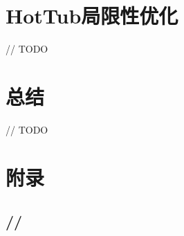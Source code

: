 \documentclass[lang=cn,12pt,a4paper,cite=authoryear]{elegantpaper}
\begin{document}
\section{HotTub局限性优化}
// TODO

\section{总结}
// TODO

\nocite{*}
\cleardoublepage


\cleardoublepage
\appendix
\addappheadtotoc
\section{附录}

\subsection{//}
\end{document}
